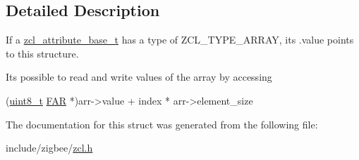 \subsection{Detailed Description}
If a \hyperlink{structzcl__attribute__base__t}{zcl\+\_\+attribute\+\_\+base\+\_\+t} has a type of Z\+C\+L\+\_\+\+T\+Y\+P\+E\+\_\+\+A\+R\+R\+AY, its .value points to this structure. 

It\textquotesingle{}s possible to read and write values of the array by accessing 
\begin{DoxyCode}
(\hyperlink{group__hal__dos_gae1affc9ca37cfb624959c866a73f83c2}{uint8\_t} \hyperlink{group__hal_gaef060b3456fdcc093a7210a762d5f2ed}{FAR} *)arr->value + index * arr->element\_size 
\end{DoxyCode}
 

The documentation for this struct was generated from the following file\+:\begin{DoxyCompactItemize}
\item 
include/zigbee/\hyperlink{zcl_8h}{zcl.\+h}\end{DoxyCompactItemize}
